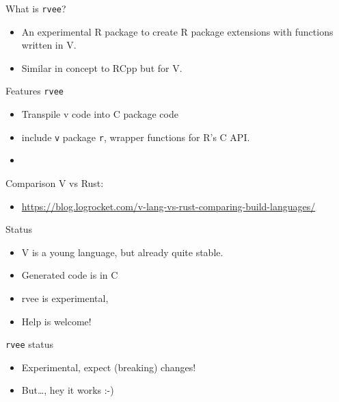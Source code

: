 \documentclass[
  ignorenonframetext,
]{beamer}
\providecommand{\tightlist}{%
  \setlength{\itemsep}{0pt}\setlength{\parskip}{0pt}}
\begin{document}
\begin{frame}{What is \texttt{rvee}?}
\protect\hypertarget{what-is-rvee}{}
\begin{itemize}
\tightlist
\item
  An experimental R package to create R package extensions with
  functions written in V.
\item
  Similar in concept to RCpp but for V.
\end{itemize}
\end{frame}

\begin{frame}[fragile]{Features \texttt{rvee}}
\protect\hypertarget{features-rvee}{}
\begin{itemize}
\tightlist
\item
  Transpile v code into C package code
\item
  include \texttt{v} package \texttt{r}, wrapper functions for R's C
  API.
\item
\end{itemize}
\end{frame}

\begin{frame}{}
\protect\hypertarget{section-2}{}
Comparison V vs Rust:

\begin{itemize}
\tightlist
\item
  \url{https://blog.logrocket.com/v-lang-vs-rust-comparing-build-languages/}
\end{itemize}
\end{frame}

\begin{frame}{Status}
\protect\hypertarget{status}{}
\begin{itemize}
\item
  V is a young language, but already quite stable.
\item
  Generated code is in C
\item
  rvee is experimental,
\item
  Help is welcome!
\end{itemize}
\end{frame}

\begin{frame}{\texttt{rvee} status}
\protect\hypertarget{rvee-status}{}
\begin{itemize}
\tightlist
\item
  Experimental, expect (breaking) changes!
\item
  But\ldots, hey it works :-)
\end{itemize}
\end{frame}
\end{document}
